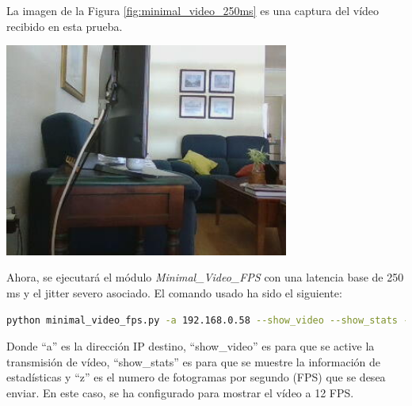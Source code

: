 \newpage
La imagen de la Figura \ref{fig:minimal_video_250ms} es una captura del vídeo recibido en esta prueba.
\begin{center}
  \includegraphics[width = 0.7\textwidth]{images/VideoRecibido6.1.png}
  \label{fig:minimal_video_250ms}
\end{center}

\newpage


Ahora, se ejecutará el módulo \textit{Minimal\_Video\_FPS} con una latencia base de 250 ms y el jitter severo asociado. El comando usado ha sido el siguiente:

\begin{lstlisting}[language=bash, basicstyle=\ttfamily\scriptsize]
    python minimal_video_fps.py -a 192.168.0.58 --show_video --show_stats -z 12
\end{lstlisting}
Donde ``a'' es la dirección IP destino, ``show\_video'' es para que se active la transmisión de vídeo, ``show\_stats'' es para que se muestre la información de estadísticas y ``z'' es el numero de fotogramas por segundo (FPS) que se desea enviar. En este caso, se ha configurado para mostrar el vídeo a 12 FPS.
\vspace{\baselineskip}

